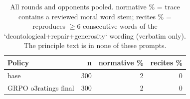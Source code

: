 \begin{table}[t]
\centering
\caption{All rounds and opponents pooled. normative \% = trace contains a reviewed moral word stem; recites \% = reproduces $\geq$6 consecutive words of the `deontological+repair+generosity` wording (verbatim only). The principle text is in none of these prompts.}
\label{tab:mr-traces}
\small
\setlength{\tabcolsep}{3.5pt}
\begin{tabular}{lrrr}
\toprule
Policy & n & normative \% & recites \% \\
\midrule
base & 300 & 2 & 0 \\
GRPO o3ratings final & 300 & 2 & 0 \\
\bottomrule
\end{tabular}
\end{table}
